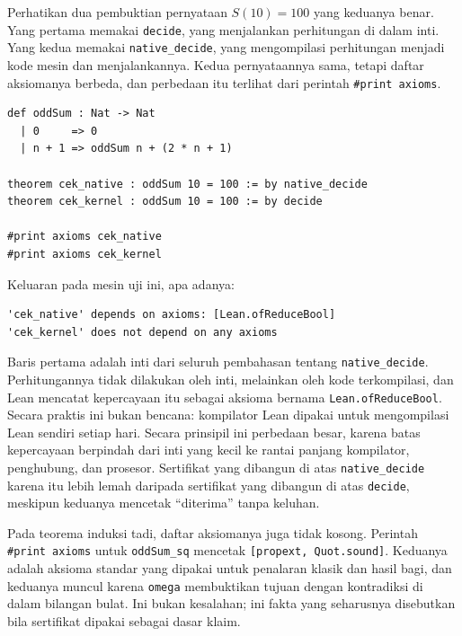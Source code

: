 \begin{contoh}
Perhatikan dua pembuktian pernyataan $S(10)=100$ yang keduanya benar. Yang pertama memakai
\texttt{decide}, yang menjalankan perhitungan di dalam inti. Yang kedua memakai
\texttt{native\_decide}, yang mengompilasi perhitungan menjadi kode mesin
dan menjalankannya. Kedua pernyataannya sama, tetapi daftar aksiomanya berbeda, dan perbedaan itu
terlihat dari perintah \texttt{\#print axioms}.
\end{contoh}

\begin{verbatim}
def oddSum : Nat -> Nat
  | 0     => 0
  | n + 1 => oddSum n + (2 * n + 1)

theorem cek_native : oddSum 10 = 100 := by native_decide
theorem cek_kernel : oddSum 10 = 100 := by decide

#print axioms cek_native
#print axioms cek_kernel
\end{verbatim}

Keluaran pada mesin uji ini, apa adanya:

\begin{verbatim}
'cek_native' depends on axioms: [Lean.ofReduceBool]
'cek_kernel' does not depend on any axioms
\end{verbatim}

Baris pertama adalah inti dari seluruh pembahasan tentang \texttt{native\_decide}. Perhitungannya
tidak dilakukan oleh inti, melainkan oleh kode terkompilasi, dan Lean mencatat kepercayaan itu
sebagai aksioma bernama \texttt{Lean.ofReduceBool}. Secara praktis ini bukan bencana: kompilator
Lean dipakai untuk mengompilasi Lean sendiri setiap hari. Secara prinsipil ini perbedaan besar,
karena batas kepercayaan berpindah dari inti yang kecil ke rantai panjang kompilator, penghubung,
dan prosesor. Sertifikat yang dibangun di atas \texttt{native\_decide} karena itu lebih lemah
daripada sertifikat yang dibangun di atas \texttt{decide}, meskipun keduanya mencetak ``diterima''
tanpa keluhan.

Pada teorema induksi tadi, daftar aksiomanya juga tidak kosong. Perintah \texttt{\#print axioms}
untuk \texttt{oddSum\_sq} mencetak \texttt{[propext, Quot.sound]}. Keduanya adalah aksioma standar yang dipakai untuk
penalaran klasik dan hasil bagi, dan keduanya muncul karena \texttt{omega} membuktikan tujuan
dengan kontradiksi di dalam bilangan bulat. Ini bukan kesalahan; ini fakta yang seharusnya
disebutkan bila sertifikat dipakai sebagai dasar klaim.

